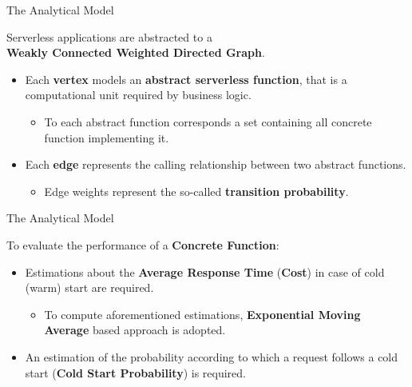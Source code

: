 \documentclass[13.5pt]{beamer}
\newcommand{\B}[1]{\textcolor{TorVergataColor}{\textbf{#1}}}
\begin{document}
\begin{frame}{The Analytical Model}
	
	\begin{block}{}
		\centering
		Serverless applications are abstracted to a \\\B{Weakly Connected Weighted Directed Graph}.
	\end{block}
	\vspace{\baselineskip}
	\begin{itemize}
		\item Each \B{vertex} models an \B{abstract serverless function}, that is a computational unit required by business logic.
		\begin{itemize}
			\item To each abstract function corresponds a set containing all concrete function implementing it.
		\end{itemize}
		\vspace{\baselineskip}
		\item Each \B{edge} represents the calling relationship between two abstract functions.
		\begin{itemize}
			\item Edge weights represent the so-called \B{transition probability}. 
		\end{itemize}
	\end{itemize}
	
	

	
\end{frame} 
\begin{frame}{The Analytical Model}

To evaluate the performance of a \textbf{Concrete Function}:
\vspace{\baselineskip}
\begin{itemize}
	\item Estimations about the \B{Average Response Time} (\B{Cost}) in case of cold (warm) start are required.
	\begin{itemize}
		\item To compute aforementioned estimations, \B{Exponential Moving Average} based approach is adopted.
	\end{itemize}
	\vspace{\baselineskip}
	\item An estimation of the probability according to which a request follows a cold start (\B{Cold Start Probability}) is required.
\end{itemize}

\end{frame} 
\end{document}
